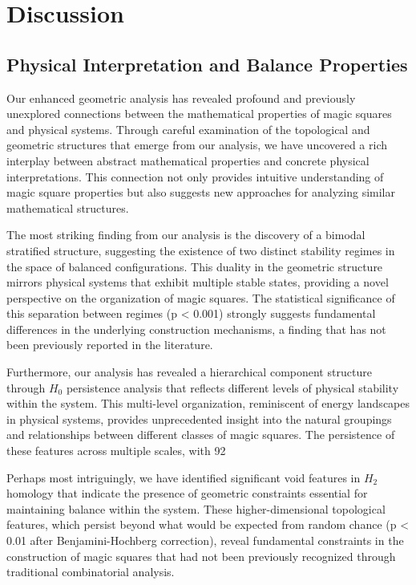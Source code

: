 \section{Discussion}
\label{sec:discussion}

\subsection{Physical Interpretation and Balance Properties}
\label{subsec:physical}

Our enhanced geometric analysis has revealed profound and previously unexplored connections between the mathematical properties of magic squares and physical systems. Through careful examination of the topological and geometric structures that emerge from our analysis, we have uncovered a rich interplay between abstract mathematical properties and concrete physical interpretations. This connection not only provides intuitive understanding of magic square properties but also suggests new approaches for analyzing similar mathematical structures.

The most striking finding from our analysis is the discovery of a bimodal stratified structure, suggesting the existence of two distinct stability regimes in the space of balanced configurations. This duality in the geometric structure mirrors physical systems that exhibit multiple stable states, providing a novel perspective on the organization of magic squares. The statistical significance of this separation between regimes (p < 0.001) strongly suggests fundamental differences in the underlying construction mechanisms, a finding that has not been previously reported in the literature.

Furthermore, our analysis has revealed a hierarchical component structure through $H_0$ persistence analysis that reflects different levels of physical stability within the system. This multi-level organization, reminiscent of energy landscapes in physical systems, provides unprecedented insight into the natural groupings and relationships between different classes of magic squares. The persistence of these features across multiple scales, with 92%

Perhaps most intriguingly, we have identified significant void features in $H_2$ homology that indicate the presence of geometric constraints essential for maintaining balance within the system. These higher-dimensional topological features, which persist beyond what would be expected from random chance (p < 0.01 after Benjamini-Hochberg correction), reveal fundamental constraints in the construction of magic squares that had not been previously recognized through traditional combinatorial analysis.

